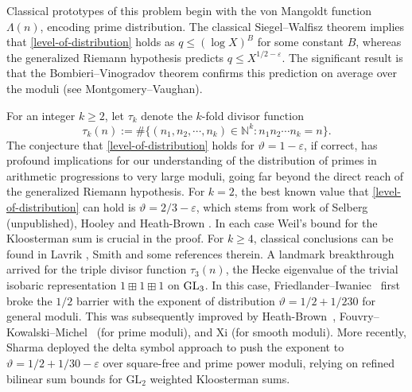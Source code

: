 \documentclass[11pt,reqno]{amsart}
\numberwithin{equation}{section}
\theoremstyle{plain}
\theoremstyle{definition}
\begin{document}
Classical prototypes of this problem begin with the von Mangoldt function 
$\Lambda(n)$, encoding prime distribution.
The classical Siegel--Walfisz theorem implies that \eqref{level-of-distribution}
holds as $q\leq (\log X)^{B}$ for some constant $B$, 
whereas the generalized Riemann hypothesis predicts $q\leq X^{1/2-\varepsilon}$. 
The significant result is that the Bombieri--Vinogradov theorem
confirms this prediction on average over the moduli (see Montgomery--Vaughan\cite{MV}).

For an integer \(k\geq2\), let \(\tau_k\) denote the \(k\)-fold divisor function
$$
\tau_k(n):=\#\{(n_1, n_2, \cdots, n_k)\in \mathbb{N}^k: n_1n_2\cdots n_k=n\}.
$$
The conjecture that \eqref{level-of-distribution} holds for $\vartheta=1-\varepsilon$, if correct,
has profound implications for our understanding of
the distribution of primes
in arithmetic progressions to very large moduli,
going far beyond the direct reach of
the generalized Riemann hypothesis.
For $k=2$, the best known value that \eqref{level-of-distribution} can hold is $\vartheta=2/3-\varepsilon$,
which stems from work of Selberg (unpublished), Hooley \cite{Hooley} and Heath-Brown \cite{HB1979}.
In each case Weil's bound for the Kloosterman sum is crucial in the proof.
For $k\geq 4$, classical conclusions can be found in Lavrik \cite{Lavrik},
Smith \cite{Smith} and some references therein.
A landmark breakthrough arrived for the triple divisor function $\tau_3(n)$, 
the Hecke eigenvalue of the trivial isobaric representation $1\boxplus1\boxplus 1$ on $\rm GL_3$.
In this case, Friedlander--Iwaniec~\cite{FI1985} first broke the $1/2$ barrier with
the exponent of distribution $\vartheta=1/2+1/230$ for
general moduli. This was subsequently improved by Heath-Brown~\cite{HB1986}, 
Fouvry--Kowalski--Michel~\cite{FKM2015} (for prime moduli), and Xi \cite{Xi} (for smooth moduli).
More recently,
Sharma \cite{Sharma} deployed the delta symbol approach to push the exponent to
 $\vartheta=1/2+1/30-\varepsilon$
over square-free and prime power moduli, relying on refined bilinear sum bounds for $\textrm{GL}_2$
weighted Kloosterman sums.
\end{document}
